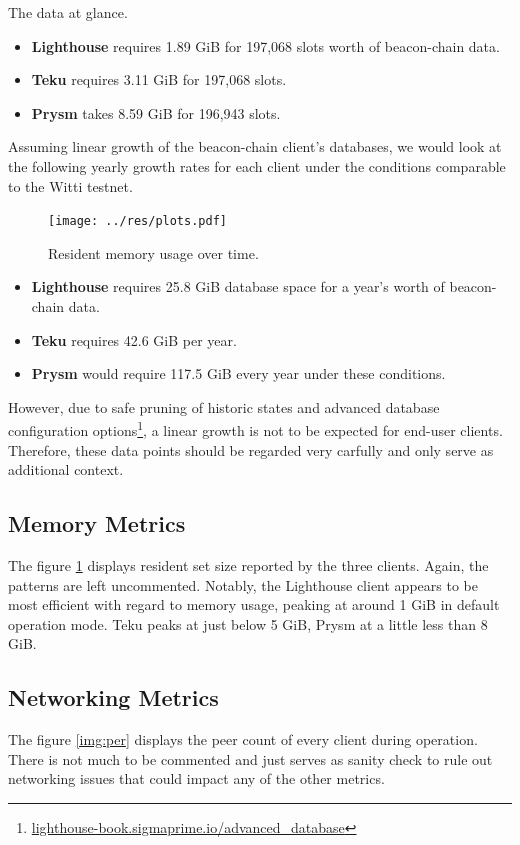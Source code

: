 \documentclass[twoside,twocolumn]{article}
\begin{document}
The data at glance.
\begin{itemize}
\item \textbf{Lighthouse} requires 1.89 GiB for 197,068 slots worth of beacon-chain data.
\item \textbf{Teku} requires 3.11 GiB for 197,068 slots.
\item \textbf{Prysm} takes 8.59 GiB for 196,943 slots.
\end{itemize}

Assuming linear growth of the beacon-chain client's databases, we would look at the following yearly growth rates for each client under the conditions comparable to the Witti testnet.

\begin{figure}[t]
	\centering
	\texttt{[image: ../res/plots.pdf]}
	\caption{Resident memory usage over time.}
	\label{img:mem}
\end{figure}

\begin{itemize}
\item \textbf{Lighthouse} requires 25.8 GiB database space for a year's worth of beacon-chain data.
\item \textbf{Teku} requires 42.6 GiB per year.
\item \textbf{Prysm} would require 117.5 GiB every year under these conditions.
\end{itemize}

However, due to safe pruning of historic states and advanced database configuration options\footnote{\href{https://lighthouse-book.sigmaprime.io/advanced_database.html}{lighthouse-book.sigmaprime.io/advanced\_database}}, a linear growth is not to be expected for end-user clients. Therefore, these data points should be regarded very carfully and only serve as additional context.\par

\subsection{Memory Metrics}
The figure \ref{img:mem} displays resident set size reported by the three clients. Again, the patterns are left uncommented. Notably, the Lighthouse client appears to be most efficient with regard to memory usage, peaking at around 1 GiB in default operation mode. Teku peaks at just below 5 GiB, Prysm at a little less than 8 GiB.\par

\subsection{Networking Metrics}
\label{sec:perf:p2p}
The figure \ref{img:per} displays the peer count of every client during operation. There is not much to be commented and just serves as sanity check to rule out networking issues that could impact any of the other metrics.\par
\end{document}
